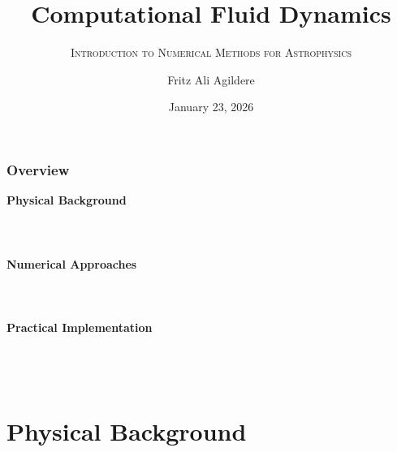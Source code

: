 

\author[F. A. Agildere]{Fritz Ali Agildere}

\date[Jan. 23, 2026]{January 23, 2026}

\title{Computational Fluid Dynamics}
\subtitle{\textsc{Introduction to Numerical Methods for Astrophysics}}

\institute[UNITOV]{}


	\begin{frame}[noframenumbering]
		\titlepage
	\end{frame}

	\begin{frame}
		\frametitle{Overview}
		\bfseries{Physical Background}\\[1.5pt]
		\hspace*{3ex}\\
		\hspace*{3ex}\\
		\hspace*{3ex}\\[3.0pt]
		\bfseries{Numerical Approaches}\\[1.5pt]
		\hspace*{3ex}\\
		\hspace*{3ex}\\
		\hspace*{3ex}\\[3.0pt]
		\bfseries{Practical Implementation}\\[1.5pt]
		\hspace*{3ex}\\
		\hspace*{3ex}\\
		\hspace*{3ex}\\[3.0pt]
	\end{frame}

	\section{Physical Background}

